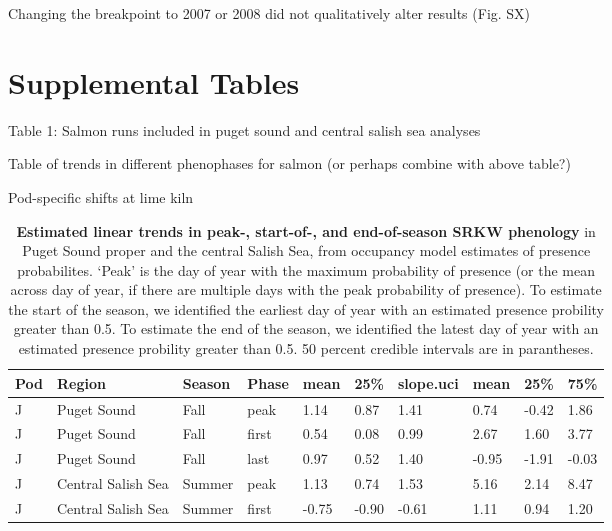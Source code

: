 \documentclass{article}
\begin{document}
\par Changing the breakpoint to 2007 or 2008 did not qualitatively alter results (Fig. SX)

\section* {Supplemental Tables}
\par Table 1: Salmon runs included in puget sound and central salish sea analyses 
\par Table of trends in different phenophases for salmon (or perhaps combine with above table?)
\par Pod-specific shifts at lime kiln

\begin{table}[ht]
\centering
\caption{\textbf{Estimated linear trends in peak-, start-of-, and end-of-season SRKW phenology} in Puget Sound proper and the central Salish Sea, from occupancy model estimates of presence probabilites. `Peak' is the day of year with the maximum probability of presence (or the mean across day of year, if there are multiple days with the peak probability of presence). To estimate the start of the season, we identified the earliest day of year with an estimated presence probility greater than 0.5. To estimate the end of the season, we identified the latest day of year with an estimated presence probility greater than 0.5. 50 percent credible intervals are in parantheses.} 
\label{tab:modsz}
\begingroup\footnotesize
\begin{tabular}{|p{}|p{}|p{}|p{}|p{}|p{}|p{}|p{}|p{}|p{}|}
  \hline
Pod & Region & Season & Phase & mean & 25\% & slope.uci & mean & 25\% & 75\% \\ 
  \hline
J & Puget Sound & Fall & peak & 1.14 & 0.87 & 1.41 & 0.74 & -0.42 & 1.86 \\ 
  J & Puget Sound & Fall & first & 0.54 & 0.08 & 0.99 & 2.67 & 1.60 & 3.77 \\ 
  J & Puget Sound & Fall & last & 0.97 & 0.52 & 1.40 & -0.95 & -1.91 & -0.03 \\ 
  J & Central Salish Sea & Summer & peak & 1.13 & 0.74 & 1.53 & 5.16 & 2.14 & 8.47 \\ 
  J & Central Salish Sea & Summer & first & -0.75 & -0.90 & -0.61 & 1.11 & 0.94 & 1.20 \\ 

\end{tabular}
\end{table}
\end{document}
